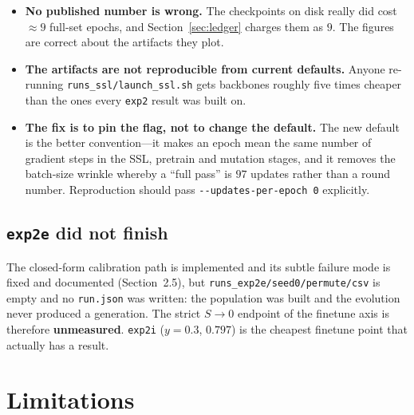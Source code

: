 \documentclass[11pt,a4paper]{article}
\newcommand{\code}[1]{\texttt{\small #1}}
\newcommand{\file}[1]{\texttt{\small #1}}
\begin{document}
\begin{itemize}[leftmargin=*]
\item \textbf{No published number is wrong.} The checkpoints on disk really did
      cost $\approx 9$ full-set epochs, and Section~\ref{sec:ledger} charges
      them as $9$. The figures are correct about the artifacts they plot.
\item \textbf{The artifacts are not reproducible from current defaults.}
      Anyone re-running \file{runs\_ssl/launch\_ssl.sh} gets backbones roughly
      five times cheaper than the ones every \code{exp2} result was built on.
\item \textbf{The fix is to pin the flag, not to change the default.} The
      new default is the better convention---it makes an epoch mean the same
      number of gradient steps in the SSL, pretrain and mutation stages, and it
      removes the batch-size wrinkle whereby a ``full pass'' is $97$ updates
      rather than a round number. Reproduction should pass
      \code{-{}-updates-per-epoch 0} explicitly.
\end{itemize}

\subsection{\code{exp2e} did not finish}

The closed-form calibration path is implemented and its subtle failure mode is
fixed and documented (Section~2.5), but
\file{runs\_exp2e/seed0/permute/csv} is empty and no \file{run.json} was
written: the population was built and the evolution never produced a
generation. The strict $S \to 0$ endpoint of the finetune axis is therefore
\textbf{unmeasured}. \code{exp2i} ($y{=}0.3$, $0.797$) is the cheapest finetune
point that actually has a result.

\section{Limitations}
\end{document}
